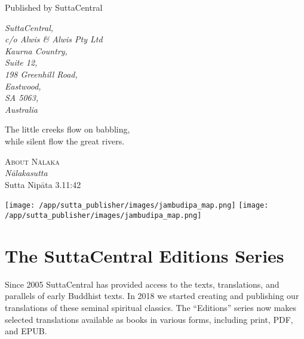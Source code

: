 \documentclass[12pt,openany]{book}%
\newcommand{\blankpage}{
\newpage
\thispagestyle{empty}
\mbox{}
\newpage
}
\newcommand*{\epigraphTranslatedTitle}[1]{\vspace*{.5em}\footnotesize\textsc{#1}\\}%
\newcommand*{\epigraphRootTitle}[1]{\footnotesize\textit{#1}\\}%
\newcommand*{\epigraphReference}[1]{\footnotesize{#1}}%
\begin{document}
\begin{footnotesize}
\medskip

Published by SuttaCentral

\medskip

\textit{SuttaCentral,\\
c/o Alwis \& Alwis Pty Ltd\\
Kaurna Country,\\
Suite 12,\\
198 Greenhill Road,\\
Eastwood,\\
SA 5063,\\
Australia}

\end{footnotesize}

\newpage

\setlength{\parindent}{1em}%
\newpage

\vspace*{\fill}

\begin{center}
\epigraph{The little creeks flow on babbling,\\
while silent flow the great rivers.}
{
\epigraphTranslatedTitle{About \textsanskrit{Nālaka}}
\epigraphRootTitle{\textsanskrit{Nālakasutta}}
\epigraphReference{Sutta \textsanskrit{Nipāta} 3.11:42}
}
\end{center}

\vspace*{2in}

\vspace*{\fill}

\setlength{\parindent}{0em}
\sbox{}%
\texttt{[image: /app/sutta\_publisher/images/jambudipa\_map.png]}
\newpage
\texttt{[image: /app/sutta\_publisher/images/jambudipa\_map.png]}
\newpage
\restoregeometry

\blankpage%

\setlength{\parindent}{1em}
%
\tableofcontents
\newpage
\pagestyle{fancy}
%
\chapter*{The SuttaCentral Editions Series}

Since 2005 SuttaCentral has provided access to the texts, translations, and parallels of early Buddhist texts. In 2018 we started creating and publishing our translations of these seminal spiritual classics. The “Editions” series now makes selected translations available as books in various forms, including print, PDF, and EPUB.
\end{document}
